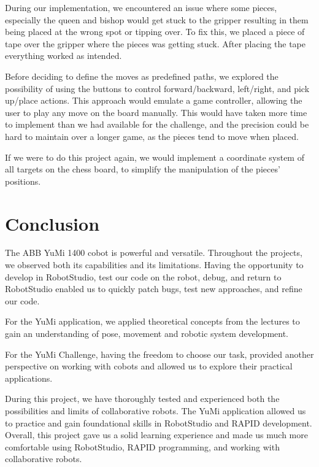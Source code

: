 \documentclass[a4paper,12pt]{article}
\begin{document}
During our implementation, we encountered an issue where some pieces, especially the queen and bishop would get stuck to the gripper resulting in them being placed at the wrong spot or tipping over. To fix this, we placed a piece of tape over the gripper where the pieces was getting stuck. After placing the tape everything worked as intended.

Before deciding to define the moves as predefined paths, we explored the possibility of using the buttons to control forward/backward, left/right, and pick up/place actions. This approach would emulate a game controller, allowing the user to play any move on the board manually. This would have taken more time to implement than we had available for the challenge, and the precision could be hard to maintain over a longer game, as the pieces tend to move when placed.

If we were to do this project again, we would implement a coordinate system of all targets on the chess board, to simplify the manipulation of the pieces' positions.

\section{Conclusion}
The ABB YuMi 1400 cobot is powerful and versatile. Throughout the projects, we observed both its capabilities and its limitations. Having the opportunity to develop in RobotStudio, test our code on the robot, debug, and return to RobotStudio enabled us to quickly patch bugs, test new approaches, and refine our code.


For the YuMi application, we applied theoretical concepts from the lectures to gain an understanding of pose, movement and robotic system development.

For the YuMi Challenge, having the freedom to choose our task, provided another perspective on working with cobots and allowed us to explore their practical applications.

During this project, we have thoroughly tested and experienced both the possibilities and limits of collaborative robots. The YuMi application allowed us to practice and gain foundational skills in RobotStudio and RAPID development. Overall, this project gave us a solid learning experience and made us much more comfortable using RobotStudio, RAPID programming, and working with collaborative robots.
\nocite{*} %
\printbibliography
\end{document}
